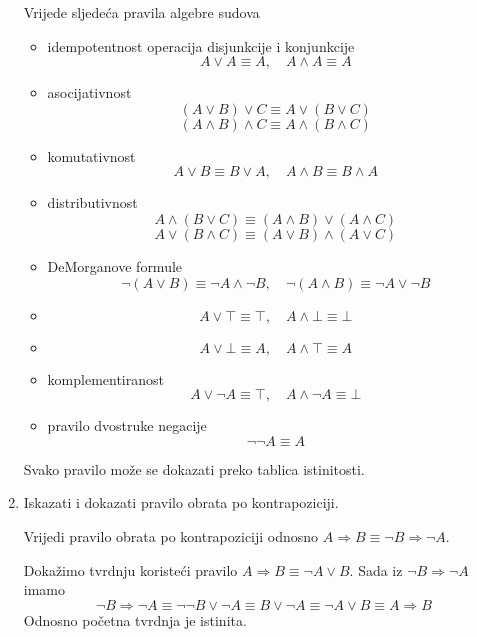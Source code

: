 \documentclass{article}
\begin{document}
\begin{enumerate}
Vrijede sljedeća pravila algebre sudova
\begin{itemize}
\item idempotentnost operacija disjunkcije i konjunkcije
$$A\lor A\equiv A,\quad A\land A\equiv A$$
\item asocijativnost
$$(A\lor B)\lor C\equiv A\lor (B\lor C)$$
$$(A\land B)\land C\equiv A\land (B\land C)$$
\item komutativnost
$$A\lor B\equiv B\lor A,\quad A\land B\equiv B\land A$$
\item distributivnost
$$A\land (B\lor C)\equiv (A\land B)\lor (A\land C)$$
$$A\lor (B\land C)\equiv (A\lor B)\land (A\lor C)$$
\item DeMorganove formule
$$\neg (A\lor B)\equiv \neg A\land\neg B,\quad\neg (A\land B)\equiv \neg A\lor\neg B$$
\item $$A\lor\top\equiv\top,\quad A\land\bot\equiv\bot$$
\item $$A\lor\bot\equiv A,\quad A\land\top\equiv A$$
\item komplementiranost
$$A\lor\neg A\equiv\top,\quad A\land\neg A\equiv\bot$$
\item pravilo dvostruke negacije
$$\neg\neg A\equiv A$$
\end{itemize}

Svako pravilo može se dokazati preko tablica istinitosti.

\item Iskazati i dokazati pravilo obrata po kontrapoziciji.

Vrijedi pravilo obrata po kontrapoziciji odnosno $A\Rightarrow B\equiv \neg B\Rightarrow\neg A$.

Dokažimo tvrdnju koristeći pravilo $A\Rightarrow B\equiv\neg A\lor B$. Sada iz $\neg B\Rightarrow\neg A$ imamo $$\neg B\Rightarrow\neg A\equiv\neg\neg B\lor\neg A\equiv B\lor\neg A\equiv\neg A\lor B\equiv A\Rightarrow B$$
Odnosno početna tvrdnja je istinita.

\end{enumerate}
\end{document}
